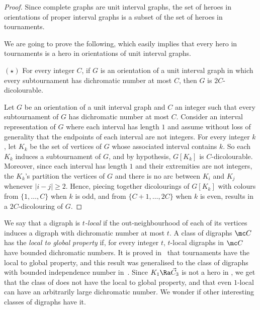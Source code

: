 \begin{proof}
Since complete graphs are unit interval graphs, the set of heroes in  orientations of proper interval graphs is a subset of the set of heroes in tournaments. 

We are going to prove the following, which easily implies that every hero in tournaments is a hero in orientations of unit interval graphs. \smallskip

$(\star)$ For every integer $C$, if $G$ is an orientation of a unit interval graph in which every subtournament has dichromatic number at most $C$, then $G$ is $2C$-dicolourable. 
\smallskip

Let $G$ be an orientation of a unit interval graph and $C$ an integer such that every subtournament of $G$ has dichromatic number at most $C$. 
Consider an interval representation of $G$ where each interval has length $1$ and assume without loss of generality that the endpoints of each interval are not integers. 
 For every integer $k$, let $K_k$ be the set of vertices of $G$ whose associated interval contains $k$. So each $K_k$ induces a subtournament of $G$, and by hypothesis, $G[K_k]$ is $C$-dicolourable. Moreover, since each interval has length $1$ and their extremities are not integers, the $K_k$'s  partition the vertices of $G$ and  there is no arc between $K_i$ and $K_j$ whenever $|i-j| \geq 2$.  Hence, piecing together dicolourings of $G[K_k]$ with colours from $\{1, \dots, C\}$ when $k$ is odd, and from $\{C+1, \dots, 2C\}$ when $k$ is even, results in a $2C$-dicolouring of $G$. %
\end{proof}


We say that a digraph is \emph{$t$-local} if the out-neighbourhood of each of its vertices induces a digraph with dichromatic number at most $t$. A class of digraphs $\mc C$ has the \emph{local to global property} if, for every integer $t$, $t$-local digraphs in $\mc C$ have bounded dichromatic numbers. 
It is proved in~\cite{HLTW19} that tournaments have the local to global property, and this result was generalised to the class of digraphs with bounded independence number in~\cite{HLNT19}.  
Since $K_1 \Ra  \vec C_3$ is not a hero in \ocgs, we get that the class of \ocgs does not have the local to global property, and that even $1$-local \ocgs can have an arbitrarily large dichromatic number. 
We wonder if other interesting classes of digraphs have it.
\bigskip

